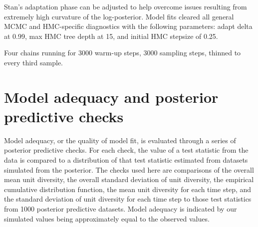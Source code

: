 \documentclass[12pt,letterpaper]{article}
\begin{document}
Stan's adaptation phase can be adjusted to help overcome issues resulting from extremely high curvature of the log-posterior. Model fits cleared all general MCMC and HMC-specific diagnostics with the following parameters: adapt delta at 0.99, max HMC tree depth at 15, and initial HMC stepsize of 0.25. 

Four chains running for 3000 warm-up steps, 3000 sampling steps, thinned to every third sample.


\section{Model adequacy and posterior predictive checks}

Model adequacy, or the quality of model fit, is evaluated through a series of posterior predictive checks. For each check, the value of a test statistic from the data is compared to a distribution of that test statistic estimated from datasets simulated from the posterior. The checks used here are comparisons of the overall mean unit diversity, the overall standard deviation of unit diversity, the empirical cumulative distribution function, the mean unit diversity for each time step, and the standard deviation of unit diversity for each time step to those test statistics from 1000 posterior predictive datasets. Model adequacy is indicated by our simulated values being approximately equal to the observed values.
\end{document}
